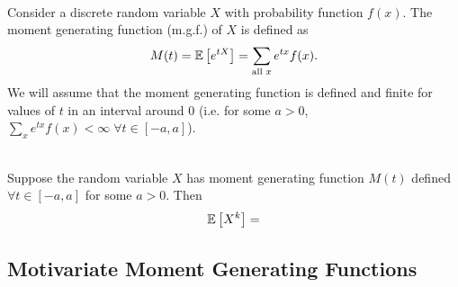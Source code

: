\begin{definition}
    \phantom{}\\
    Consider a discrete random variable $X$ with probability function $f(x)$. The moment generating function (m.g.f.) of $X$ is defined as \vspace{-3mm}
    \[
        M(t) = \mathbb{E}\left[{e^{tX}}\right] = \displaystyle \sum_{\text{all $x$}} e^{tx} f(x).
    \]
    We will assume that the moment generating function is defined and finite for values of $t$ in an interval around 0 (i.e. for some $a > 0$, $\displaystyle \sum_{x} e^{tx} f(x) < \infty \; \forall t \in [-a,a]$).
\end{definition}

\begin{theorem}
    \phantom{}\\
    Suppose the random variable $X$ has moment generating function $M(t)$ defined $\forall t \in [-a,a]$ for some $a > 0$. Then \vspace{-3mm}
    \[
        \mathbb{E}\left[{X^k}\right] = 
    \]
\end{theorem}



\subsection{Motivariate Moment Generating Functions}









\newpage